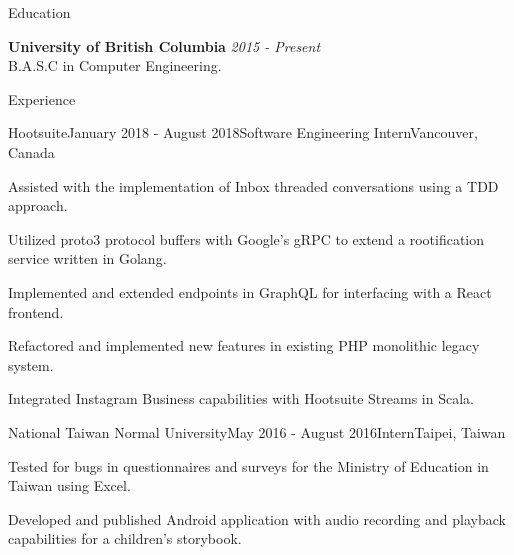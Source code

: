 \documentclass{resume} %
\begin{document}

\begin{rSection}{Education}

{\bf University of British Columbia} \hfill {\em 2015 - Present} \\ 
B.A.S.C in Computer Engineering.

\end{rSection}
\begin{rSection}{Experience}

  \begin{rSubsection}{Hootsuite}{January 2018 - August 2018}{Software Engineering Intern}{Vancouver, Canada}
\item Assisted with the implementation of Inbox threaded conversations using a TDD approach.
\item Utilized proto3 protocol buffers with Google's gRPC to extend a rootification service written in Golang.
\item Implemented and extended endpoints in GraphQL for interfacing with a React frontend.
\item Refactored and implemented new features in existing PHP monolithic legacy system.
\item Integrated Instagram Business capabilities with Hootsuite Streams in Scala.  
\end{rSubsection}
\begin{rSubsection}{National Taiwan Normal University}{May 2016 - August 2016}{Intern}{Taipei, Taiwan}
\item Tested for bugs in questionnaires and surveys for the Ministry of Education in Taiwan using Excel.
\item Developed and published Android application with audio recording and playback capabilities for a children's storybook.
\end{rSubsection}

\end{rSection}


\end{document}
